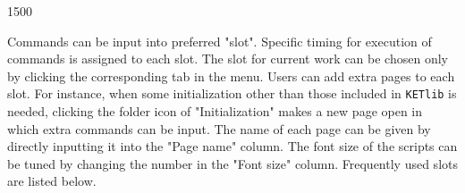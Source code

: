 \documentclass[papersize,a4paper,12pt]{article}
\begin{document}
\begin{layer}{150}{0}
\end{layer}

\vspace{105mm}

Commands can be input into preferred "slot". 
Specific timing for execution of commands 
is assigned to each slot. 
The slot for current work can be chosen 
only by clicking the corresponding tab in the menu. 
Users can add extra pages to each slot. 
For instance, 
when some initialization other than 
those included in \verb|KETlib| is needed, 
clicking the folder icon of "Initialization" makes a new page open 
in which extra commands can be input. 
The name of each page can be given 
by directly inputting it into the "Page name" column. 
The font size of the scripts can be tuned 
by changing the number in the "Font size" column. 
Frequently used slots are listed below. 
\end{document}

